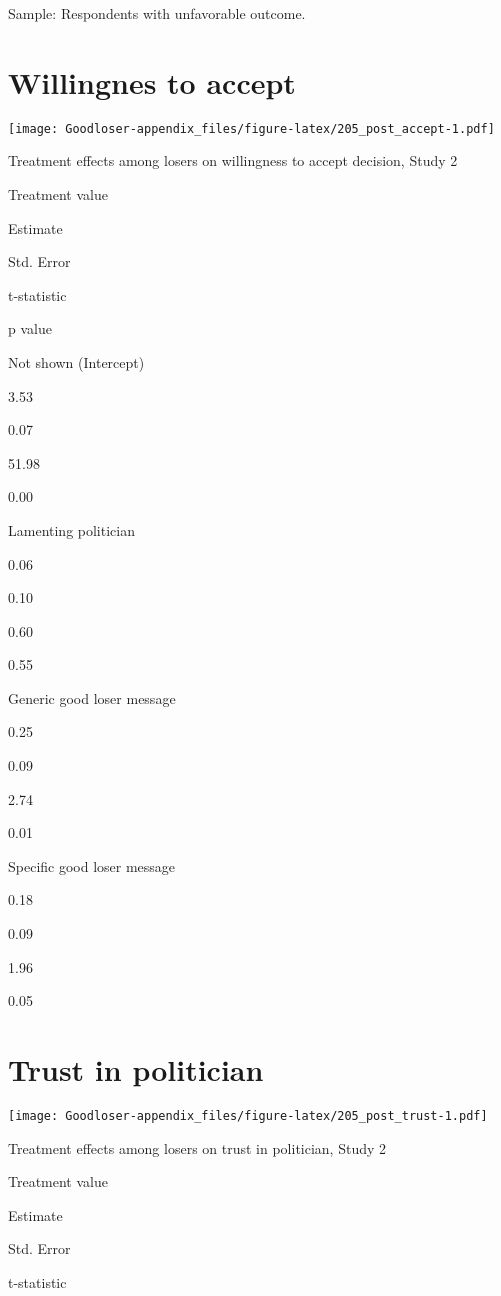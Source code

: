 \documentclass[
]{book}
\begin{document}
Sample: Respondents with unfavorable outcome.

\hypertarget{willingnes-to-accept}{%
\section{Willingnes to accept}\label{willingnes-to-accept}}

\texttt{[image: Goodloser-appendix\_files/figure-latex/205\_post\_accept-1.pdf]}

Treatment effects among losers on willingness to accept decision, Study
2

Treatment value

Estimate

Std. Error

t-statistic

p value

Not shown (Intercept)

3.53

0.07

51.98

0.00

Lamenting politician

0.06

0.10

0.60

0.55

Generic good loser message

0.25

0.09

2.74

0.01

Specific good loser message

0.18

0.09

1.96

0.05

\hypertarget{trust-in-politician}{%
\section{Trust in politician}\label{trust-in-politician}}

\texttt{[image: Goodloser-appendix\_files/figure-latex/205\_post\_trust-1.pdf]}

Treatment effects among losers on trust in politician, Study 2

Treatment value

Estimate

Std. Error

t-statistic
\end{document}
